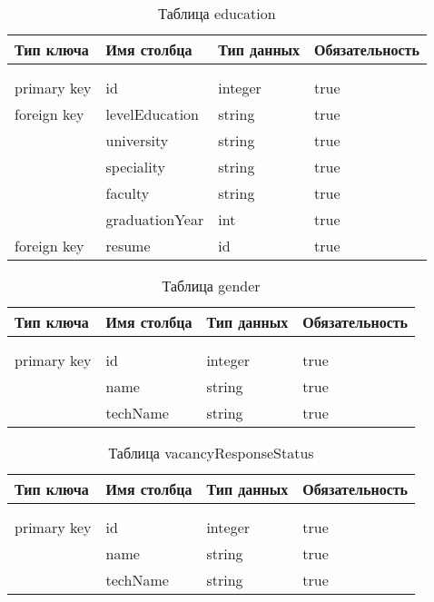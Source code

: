 \begin{xltabular}{\textwidth}{|l|l|p{1.7cm}|X|}
	\caption{Таблица education \label{education:table}}\\ \hline
	\centrow Тип ключа & \centrow Имя столбца & \centrow Тип
	данных & \centrow Обязательность \\ \hline
	 &  &  &  \\ \hline
	\endfirsthead
	 &  &  &  \\ \hline
	\finishhead
	primary key & id & integer & true \\ \hline
	foreign key	& levelEducation & string & true \\ \hline
		& university & string & true \\ \hline
		& speciality & string & true \\ \hline
		& faculty & string & true \\ \hline
		& graduationYear & int & true \\ \hline
		foreign key	& resume & id & true \\ \hline
\end{xltabular}

\begin{xltabular}{\textwidth}{|l|l|p{1.7cm}|X|}
	\caption{Таблица gender \label{gender:table}}\\ \hline
	\centrow Тип ключа & \centrow Имя столбца & \centrow Тип
	данных & \centrow Обязательность \\ \hline
	 &  &  &  \\ \hline
	\endfirsthead
	 &  &  &  \\ \hline
	\finishhead
	primary key & id & integer & true \\ \hline
	& name & string & true \\ \hline
	& techName & string & true \\ \hline
\end{xltabular}

\begin{xltabular}{\textwidth}{|l|l|p{1.7cm}|X|}
	\caption{Таблица vacancyResponseStatus \label{vacancyResponseStatus:table}}\\ \hline
	\centrow Тип ключа & \centrow Имя столбца & \centrow Тип
	данных & \centrow Обязательность \\ \hline
	 &  &  &  \\ \hline
	\endfirsthead
	 &  &  &  \\ \hline
	\finishhead
	primary key & id & integer & true \\ \hline
	& name & string & true \\ \hline
	& techName & string & true \\ \hline
\end{xltabular}

